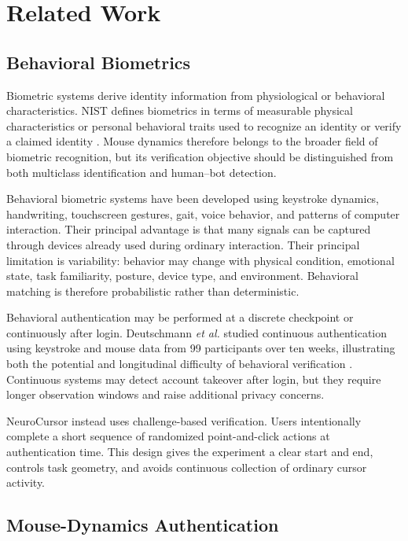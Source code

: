 \documentclass[conference]{IEEEtran}
\begin{document}
\section{Related Work}

\subsection{Behavioral Biometrics}

Biometric systems derive identity information from physiological or
behavioral characteristics. NIST defines biometrics in terms of measurable
physical characteristics or personal behavioral traits used to recognize an
identity or verify a claimed identity \cite{nistBiometrics}. Mouse dynamics
therefore belongs to the broader field of biometric recognition, but its
verification objective should be distinguished from both multiclass
identification and human--bot detection.

Behavioral biometric systems have been developed using keystroke dynamics,
handwriting, touchscreen gestures, gait, voice behavior, and patterns of
computer interaction. Their principal advantage is that many signals can be
captured through devices already used during ordinary interaction. Their
principal limitation is variability: behavior may change with physical
condition, emotional state, task familiarity, posture, device type, and
environment. Behavioral matching is therefore probabilistic rather than
deterministic.

Behavioral authentication may be performed at a discrete checkpoint or
continuously after login. Deutschmann \textit{et al.} studied continuous
authentication using keystroke and mouse data from 99 participants over ten
weeks, illustrating both the potential and longitudinal difficulty of
behavioral verification \cite{deutschmannContinuousAuthentication}.
Continuous systems may detect account takeover after login, but they require
longer observation windows and raise additional privacy concerns.

NeuroCursor instead uses challenge-based verification. Users intentionally
complete a short sequence of randomized point-and-click actions at
authentication time. This design gives the experiment a clear start and end,
controls task geometry, and avoids continuous collection of ordinary cursor
activity.

\subsection{Mouse-Dynamics Authentication}
\end{document}
